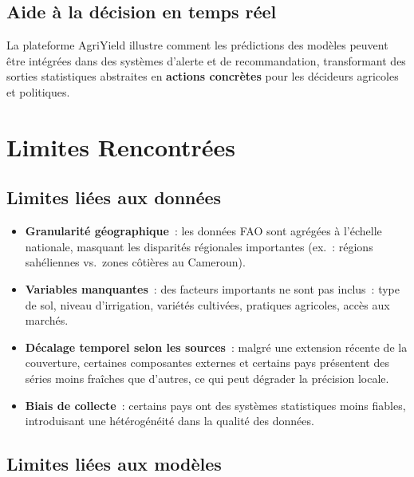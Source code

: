 \subsection{Aide à la décision en temps réel}

La plateforme AgriYield illustre comment les prédictions des modèles peuvent être intégrées dans des systèmes d'alerte et de recommandation, transformant des sorties statistiques abstraites en \textbf{actions concrètes} pour les décideurs agricoles et politiques.

\section{Limites Rencontrées}

\subsection{Limites liées aux données}

\begin{itemize}[leftmargin=1.5cm, itemsep=3pt]
  \item \textbf{Granularité géographique}~: les données FAO sont agrégées à l'échelle nationale, masquant les disparités régionales importantes (ex.~: régions sahéliennes vs.~zones côtières au Cameroun).
  \item \textbf{Variables manquantes}~: des facteurs importants ne sont pas inclus~: type de sol, niveau d'irrigation, variétés cultivées, pratiques agricoles, accès aux marchés.
  \item \textbf{Décalage temporel selon les sources}~: malgré une extension récente de la couverture, certaines composantes externes et certains pays présentent des séries moins fraîches que d'autres, ce qui peut dégrader la précision locale.
  \item \textbf{Biais de collecte}~: certains pays ont des systèmes statistiques moins fiables, introduisant une hétérogénéité dans la qualité des données.
\end{itemize}

\subsection{Limites liées aux modèles}

